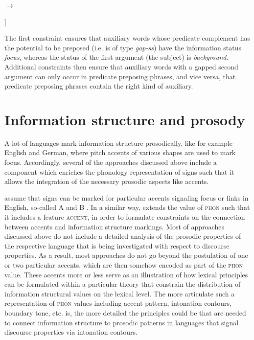 \documentclass[output=paper]{langsci/langscibook}
\begin{document}
\bigskip
\begin{avm}
$\to$\ 
\begin{avm}
  [\textit{hd-fill-ph}\\
    non-hd-dtr & [ss|status & bg]]
\end{avm}
  
\end{avm}
  \label{fig:predicatepreposing}
\z
The first constraint ensures that auxiliary words whose predicate
complement has the potential to be preposed (i.e. is of type \textit{gap-ss}) have the
information status \textit{focus}, whereas the status of the first
argument (the subject) is \textit{background}. Additional constraints
then ensure that auxiliary words with a gapped second argument can
only occur in predicate preposing phrases, and vice versa, that
predicate preposing phrases contain the right kind of auxiliary.

\section{Information structure and prosody}
\label{sec:prosody}
A lot of languages mark information structure  prosodically, like for
example English and German, where pitch accents of various shapes are
used to mark focus. Accordingly, several of the approaches discussed above
include a component which enriches the phonology representation
of signs such that it allows the integration of the necessary prosodic
aspects like accents.

\cite{EV96a} assume that signs can be marked for particular accents
signaling focus or links in English, so-called A and B \isi{accents}.
In a similar way, \cite{deKuthy2002a} extends the value of
 \textsc{phon} such that it includes a feature
 \textsc{accent}, in order to formulate constraints on
the connection between accents and information structure markings.
Most of approaches discussed above do not include a detailed analysis
of the prosodic properties of the respective language that is being
investigated with respect to discourse properties. As a result, most
approaches do not go beyond the postulation of one or two particular
accents, which are then somehow encoded as part of the \textsc{phon}
value. These accents more or less serve as an illustration of how lexical
principles can be formulated within a particular theory that constrain
the distribution of information structural values on the lexical
level. The more articulate such a representation of \textsc{phon}
values including accent pattern, intonation contours, boundary tone,
etc. is, the more detailed the principles could be that are needed to
connect information structure to prosodic patterns in languages that
signal discourse properties via intonation contours.
\end{document}
